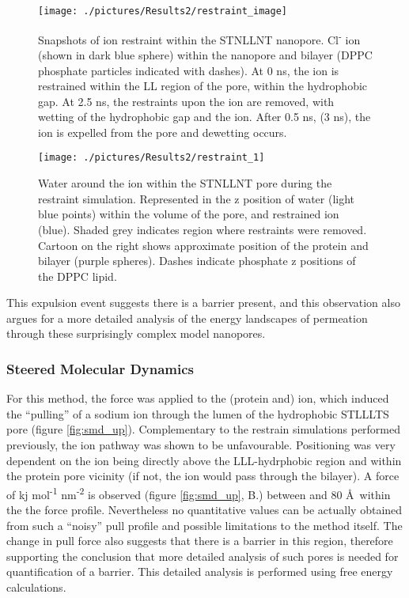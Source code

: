\begin{figure}[H]
\begin{center}
\texttt{[image: ./pictures/Results2/restraint\_image]}
\caption[Snapshots of ion restraint within the STNLLNT nanopore.] {Snapshots of ion restraint within the STNLLNT nanopore. Cl\textsuperscript{-} ion (shown in dark blue sphere) within the nanopore and bilayer (DPPC phosphate particles indicated with dashes). At 0 ns, the ion is restrained within the LL region of the pore, within the hydrophobic gap. At 2.5 ns, the restraints upon the ion are removed, with wetting of the hydrophobic gap and the ion. After 0.5 ns, (3 ns), the ion is expelled from the pore and dewetting occurs. } %
\label{fig:restraint_image}
\end{center}
\end{figure}


\begin{figure}[H]
\begin{center}
\texttt{[image: ./pictures/Results2/restraint\_1]}
\caption[Water around the ion within the STNLLNT pore during the restraint simulation.] {Water around the ion within the STNLLNT pore during the restraint simulation. Represented in the z position of water (light blue points) within the volume of the pore, and restrained ion (blue). Shaded grey indicates region where restraints were removed. Cartoon on the right shows approximate position of the protein and bilayer (purple spheres). Dashes indicate phosphate z positions of the DPPC lipid.} 
\label{fig:restraint_1}
\end{center}
\end{figure}

This expulsion event suggests there is a barrier present, and this observation also argues for a more detailed analysis of the energy landscapes of permeation through these surprisingly complex model nanopores.

\subsubsection{Steered Molecular Dynamics}

For this method, the force was applied to the (protein and) ion, which induced the ``pulling'' of a sodium ion through the lumen of the hydrophobic STLLLTS pore (figure \ref{fig:smd_up}). Complementary to the restrain simulations performed previously, the ion pathway was shown to be unfavourable. Positioning was very dependent on the ion being directly above the LLL-hydrphobic region and within the protein pore vicinity (if not, the ion would pass through the bilayer). A force of  kj mol\textsuperscript{-1} nm\textsuperscript{-2} is observed (figure \ref{fig:smd_up}, B.)  between  and 80 \AA\ within the the force profile. Nevertheless no quantitative values can be actually obtained from such a ``noisy'' pull profile and possible limitations to the method itself. The change in pull force also suggests that there is a barrier in this region, therefore supporting the conclusion that more detailed analysis of such pores is needed for quantification of a barrier. This detailed analysis is performed using free energy calculations. 

